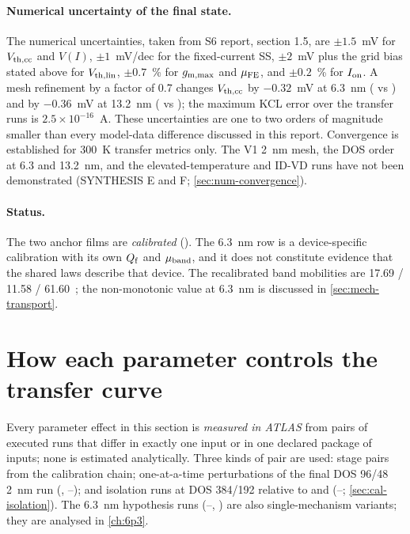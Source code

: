 \paragraph{Numerical uncertainty of the final state.} The numerical uncertainties, taken from S6 report, section 1.5, are $\pm1.5$~mV for $V_{\mathrm{th,cc}}$ and $V(I)$, $\pm1$~mV/dec for the fixed-current SS, $\pm2$~mV plus the grid bias stated above for $V_{\mathrm{th,lin}}$, $\pm0.7$~\% for $g_{\mathrm{m,max}}$ and $\mu_{\mathrm{FE}}$, and $\pm0.2$~\% for $I_{\mathrm{on}}$. A mesh refinement by a factor of 0.7 changes $V_{\mathrm{th,cc}}$ by $-0.32$~mV at 6.3~nm ( vs ) and by $-0.36$~mV at 13.2~nm ( vs ); the maximum KCL error over the transfer runs is $2.5\times10^{-16}$~A. These uncertainties are one to two orders of magnitude smaller than every model-data difference discussed in this report. Convergence is established for 300~K transfer metrics only. The V1 2~nm mesh, the DOS order at 6.3 and 13.2~nm, and the elevated-temperature and ID-VD runs have not been demonstrated (SYNTHESIS E and F; \cref{sec:num-convergence}).

\paragraph{Status.} The two anchor films are \emph{calibrated} (\evCAL). The 6.3~nm row is a device-specific calibration with its own $Q_{\mathrm{f}}$ and $\mu_{\mathrm{band}}$, and it does not constitute evidence that the shared laws describe that device. The recalibrated band mobilities are 17.69 / 11.58 / 61.60~\cmVs; the non-monotonic value at 6.3~nm is discussed in \cref{sec:mech-transport}.

\section{How each parameter controls the transfer curve}\label{sec:cal-param-control}

Every parameter effect in this section is \emph{measured in ATLAS} from pairs of executed runs that differ in exactly one input or in one declared package of inputs; none is estimated analytically. Three kinds of pair are used: stage pairs from the calibration chain; one-at-a-time perturbations of the final DOS 96/48 2~nm run  (, --); and isolation runs at DOS 384/192 relative to  and  (--; \cref{sec:cal-isolation}). The 6.3~nm hypothesis runs (--, ) are also single-mechanism variants; they are analysed in \cref{ch:6p3}.

